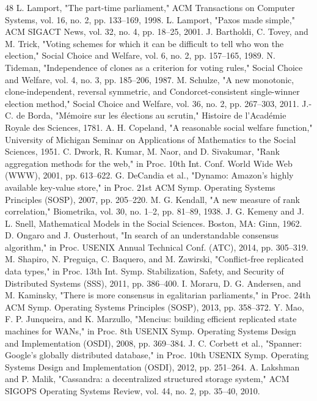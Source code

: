 \documentclass[10pt,twocolumn]{article}
\begin{document}
\begin{thebibliography}{48}
 L. Lamport, "The part-time parliament," ACM Transactions on Computer Systems, vol. 16, no. 2, pp. 133–169, 1998.
 L. Lamport, "Paxos made simple," ACM SIGACT News, vol. 32, no. 4, pp. 18–25, 2001.
 J. Bartholdi, C. Tovey, and M. Trick, "Voting schemes for which it can be difficult to tell who won the election," Social Choice and Welfare, vol. 6, no. 2, pp. 157–165, 1989.
 N. Tideman, "Independence of clones as a criterion for voting rules," Social Choice and Welfare, vol. 4, no. 3, pp. 185–206, 1987.
 M. Schulze, "A new monotonic, clone-independent, reversal symmetric, and Condorcet-consistent single-winner election method," Social Choice and Welfare, vol. 36, no. 2, pp. 267–303, 2011.
 J.-C. de Borda, "Mémoire sur les élections au scrutin," Histoire de l'Académie Royale des Sciences, 1781.
 A. H. Copeland, "A reasonable social welfare function," University of Michigan Seminar on Applications of Mathematics to the Social Sciences, 1951.
 C. Dwork, R. Kumar, M. Naor, and D. Sivakumar, "Rank aggregation methods for the web," in Proc. 10th Int. Conf. World Wide Web (WWW), 2001, pp. 613–622.
 G. DeCandia et al., "Dynamo: Amazon's highly available key-value store," in Proc. 21st ACM Symp. Operating Systems Principles (SOSP), 2007, pp. 205–220.
 M. G. Kendall, "A new measure of rank correlation," Biometrika, vol. 30, no. 1–2, pp. 81–89, 1938.
 J. G. Kemeny and J. L. Snell, Mathematical Models in the Social Sciences. Boston, MA: Ginn, 1962.
 D. Ongaro and J. Ousterhout, "In search of an understandable consensus algorithm," in Proc. USENIX Annual Technical Conf. (ATC), 2014, pp. 305–319.
 M. Shapiro, N. Preguiça, C. Baquero, and M. Zawirski, "Conflict-free replicated data types," in Proc. 13th Int. Symp. Stabilization, Safety, and Security of Distributed Systems (SSS), 2011, pp. 386–400.
 I. Moraru, D. G. Andersen, and M. Kaminsky, "There is more consensus in egalitarian parliaments," in Proc. 24th ACM Symp. Operating Systems Principles (SOSP), 2013, pp. 358–372.
 Y. Mao, F. P. Junqueira, and K. Marzullo, "Mencius: building efficient replicated state machines for WANs," in Proc. 8th USENIX Symp. Operating Systems Design and Implementation (OSDI), 2008, pp. 369–384.
 J. C. Corbett et al., "Spanner: Google's globally distributed database," in Proc. 10th USENIX Symp. Operating Systems Design and Implementation (OSDI), 2012, pp. 251–264.
 A. Lakshman and P. Malik, "Cassandra: a decentralized structured storage system," ACM SIGOPS Operating Systems Review, vol. 44, no. 2, pp. 35–40, 2010.

\end{thebibliography}
\end{document}
